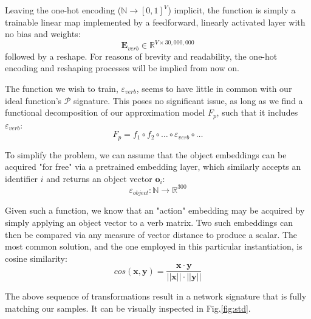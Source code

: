 \documentclass[a4paper,11pt]{article}
\newcommand{\abs}[1]{\lvert\lvert #1\rvert\rvert}
\begin{document}
Leaving the one-hot encoding ($\mathbb{N} \to [0,1]^V$) implicit, the function is simply a trainable linear map implemented by a feedforward, linearly activated layer with no bias and weights:
\[
\mathbf{E}_{verb}  \in \mathbb{R}^{V \times 30,000,000}
\]
followed by a reshape. For reasons of brevity and readability, the one-hot encoding and reshaping processes will be implied from now on.

The function we wish to train, $\varepsilon_{verb}$, seems to have little in common with our ideal function's $\mathcal{P}$ signature. This poses no significant issue, as long as we find a functional decomposition of our approximation model $F_p$, such that it includes $\varepsilon_{verb}$:
\[
F_p = f_1 \circ f_2 \circ \dots \circ \varepsilon_{verb} \circ \dots
\]

To simplify the problem, we can assume that the object embeddings can be acquired "for free" via a pretrained embedding layer, which similarly accepts an identifier $i$ and returns an object vector $\mathbf{o}_i$:
\[
\varepsilon_{object}: \mathbb{N} \to \mathbb{R}^{300}
\]

Given such a function, we know that an "action" embedding may be acquired by simply applying an object vector to a verb matrix. Two such embeddings can then be compared via any measure of vector distance to produce a scalar. The most common solution, and the one employed in this particular instantiation, is cosine similarity:
\[
cos(\mathbf{x}, \mathbf{y}) = \frac{\mathbf{x}\cdot \mathbf{y}}{\abs{\mathbf{x}}\cdot \abs{\mathbf{y}}}
\]

The above sequence of transformations result in a network signature that is fully matching our samples. It can be visually inspected in Fig.\ref{fig:std}.
\\
\end{document}
